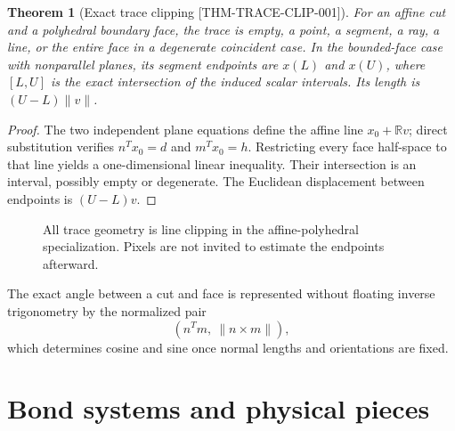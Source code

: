 \documentclass[11pt,openany]{book}
\newcommand{\R}{\mathbb R}
\newcommand{\claimid}[1]{\textnormal{\sffamily\footnotesize[#1]}}
\theoremstyle{polyplain}
\newtheorem{theorem}{Theorem}[chapter]
\theoremstyle{polydef}
\begin{document}
\begin{theorem}[Exact trace clipping \claimid{THM-TRACE-CLIP-001}]
\label{thm:exact-trace-clipping}
For an affine cut and a polyhedral boundary face, the trace is empty, a point, a segment, a ray, a line, or the entire face in a degenerate coincident case. In the bounded-face case with nonparallel planes, its segment endpoints are $x(L)$ and $x(U)$, where $[L,U]$ is the exact intersection of the induced scalar intervals. Its length is $(U-L)\lVert v\rVert$.
\end{theorem}

\begin{proof}
The two independent plane equations define the affine line $x_0+\R v$; direct substitution verifies $n^Tx_0=d$ and $m^Tx_0=h$. Restricting every face half-space to that line yields a one-dimensional linear inequality. Their intersection is an interval, possibly empty or degenerate. The Euclidean displacement between endpoints is $(U-L)v$.
\end{proof}

\begin{figure}[htbp]
\centering
{}
\caption{All trace geometry is line clipping in the affine-polyhedral specialization. Pixels are not invited to estimate the endpoints afterward.}
\label{fig:trace-clipping}
\end{figure}

The exact angle between a cut and face is represented without floating inverse trigonometry by the normalized pair
\[
\left(n^Tm,\ \lVert n\times m\rVert\right),
\]
which determines cosine and sine once normal lengths and orientations are fixed.

\section{Bond systems and physical pieces}
\end{document}
